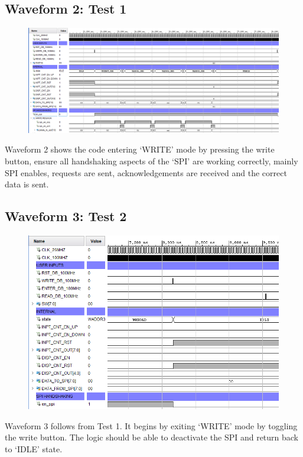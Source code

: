 \documentclass[11pt]{report}
\begin{document}
\subsection*{Waveform 2: Test 1}
\begin{figure}[H]
    \includegraphics[width=\columnwidth]{Assets/Test1.PNG}
\end{figure}

Waveform 2 shows the code entering `WRITE' mode by pressing the write button, ensure all handshaking aspects of the `SPI' are working correctly, mainly SPI enables, requests are sent, acknowledgements are received and the correct data is sent.

\subsection*{Waveform 3: Test 2}
\begin{figure}[H]
    \includegraphics[width=\columnwidth]{Assets/Test2.PNG}
\end{figure}

Waveform 3 follows from Test 1. It begins by exiting `WRITE' mode by toggling the write button. The logic should be able to deactivate the SPI and return back to `IDLE' state.
\end{document}
